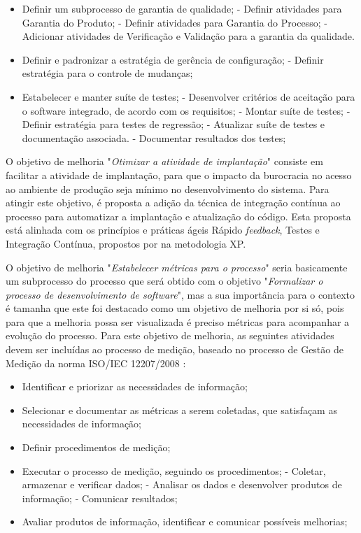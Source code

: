 \begin{itemize}
  \item Definir um subprocesso de garantia de qualidade;
    \subitem - Definir atividades para Garantia do Produto;
    \subitem - Definir atividades para Garantia do Processo;
    \subitem - Adicionar atividades de Verificação e Validação para a garantia da qualidade.
  \item Definir e padronizar a estratégia de gerência de configuração;
    \subitem - Definir estratégia para o controle de mudanças;
  \item Estabelecer e manter suíte de testes;
    \subitem - Desenvolver critérios de aceitação para o software integrado, de acordo com os requisitos;
    \subitem - Montar suíte de testes;
    \subitem - Definir estratégia para testes de regressão;
    \subitem - Atualizar suíte de testes e documentação associada.
    \subitem - Documentar resultados dos testes;
\end{itemize}

O objetivo de melhoria "\emph{Otimizar a atividade de implantação}" consiste em facilitar a atividade de implantação,
para que o impacto da burocracia no acesso ao ambiente de produção seja mínimo no desenvolvimento do sistema.
Para atingir este objetivo, é proposta a adição da técnica de integração contínua ao processo para automatizar a
implantação e atualização do código. Esta proposta está alinhada com os princípios e práticas ágeis Rápido \textit{feedback},
Testes e Integração Contínua, propostos por  na metodologia XP.

O objetivo de melhoria "\emph{Estabelecer métricas para o processo}" seria basicamente um subprocesso 
do processo que será obtido com o objetivo "\emph{Formalizar o processo de desenvolvimento de software}", 
mas a sua importância para o contexto é tamanha que este foi destacado como um objetivo de melhoria por si só,
pois para que a melhoria possa ser visualizada é preciso métricas para acompanhar a evolução do processo.
Para este objetivo de melhoria, as seguintes atividades devem ser incluídas ao processo de medição,
baseado no processo de Gestão de Medição da norma ISO/IEC 12207/2008 \cite{12207}:

\begin{itemize}
 \item Identificar e priorizar as necessidades de informação;
 \item Selecionar e documentar as métricas a serem coletadas, que satisfaçam as necessidades de informação;
 \item Definir procedimentos de medição;
 \item Executar o processo de medição, seguindo os procedimentos;
    \subitem - Coletar, armazenar e verificar dados;
    \subitem - Analisar os dados e desenvolver produtos de informação;
    \subitem - Comunicar resultados;
 \item Avaliar produtos de informação, identificar e comunicar possíveis melhorias;
\end{itemize}

